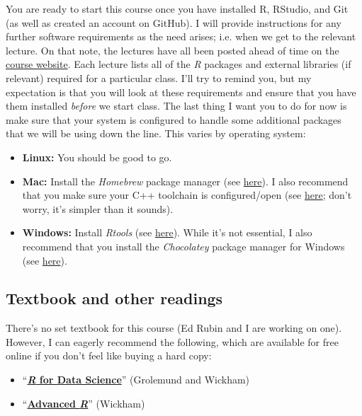 \documentclass[12]{article}
\begin{document}
You are ready to start this course once you have installed R, RStudio, and Git (as well as created an account on GitHub). I will provide instructions for any further software requirements as the need arises; i.e. when we get to the relevant lecture. On that note, the lectures have all been posted ahead of time on the \href{https://github.com/uo-ec510-2020-spring}{course website}. Each lecture lists all of the \textit{R} packages and external libraries (if relevant) required for a particular class. I'll try to remind you, but my expectation is that you will look at these requirements and ensure that you have them installed \textit{before} we start class. The last thing I want you to do for now is make sure that your system is configured to handle some additional packages that we will be using down the line. This varies by operating system:

\begin{itemize}
	\item \textbf{Linux:} You should be good to go. 
	\item \textbf{Mac:} Install the \textit{Homebrew} package manager (see \href{https://brew.sh/}{here}). I also recommend that you make sure your C++ toolchain is configured/open (see \href{https://github.com/stan-dev/rstan/wiki/Installing-RStan-from-source-on-a-Mac#prerequisite--c-toolchain-and-configuration}{here}; don't worry, it's simpler than it sounds).
	\item \textbf{Windows:} Install \textit{Rtools} (see \href{https://cran.r-project.org/bin/windows/Rtools/}{here}). While it's not essential, I also recommend that you install the \textit{Chocolatey} package manager for Windows (see \href{https://chocolatey.org/}{here}).
\end{itemize} 

\subsection*{Textbook and other readings}

There's no set textbook for this course (Ed Rubin and I are working on one). However, I can eagerly recommend the following, which are available for free online if you don't feel like buying a hard copy:
%
\begin{itemize}
	\item ``\href{http://r4ds.had.co.nz}{\textbf{\textit{R} for Data Science}}'' (Grolemund and Wickham)
    \item ``\href{https://adv-r.hadley.nz/}{\textbf{Advanced \textit{R}}}'' (Wickham)
\end{itemize}
\end{document}

